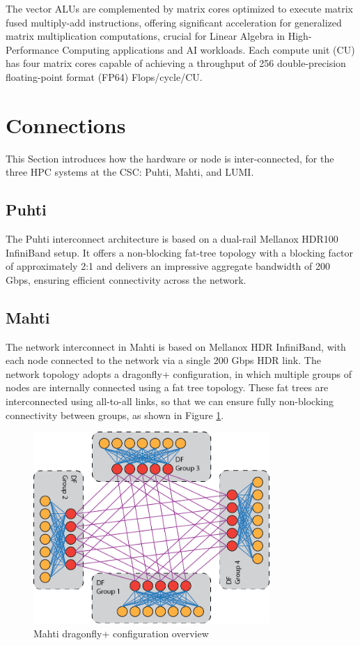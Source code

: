 The vector ALUs are complemented by matrix cores optimized to execute matrix fused multiply-add instructions, offering significant acceleration for generalized matrix multiplication computations, crucial for Linear Algebra in High-Performance Computing applications and AI workloads. Each compute unit (CU) has four matrix cores capable of achieving a throughput of 256 double-precision floating-point format (FP64) Flops/cycle/CU.

\section{Connections}
This Section introduces how the hardware or node is inter-connected, for the three HPC systems at the CSC: Puhti, Mahti, and LUMI.

\subsection{Puhti}
The Puhti\cite{puhti} interconnect architecture is based on a dual-rail Mellanox HDR100 InfiniBand setup. It offers a non-blocking fat-tree topology with a blocking factor of approximately 2:1 and delivers an impressive aggregate bandwidth of 200 Gbps, ensuring efficient connectivity across the network.

\subsection{Mahti}
The network interconnect in Mahti is based on Mellanox HDR InfiniBand, with each node connected to the network via a single 200 Gbps HDR link. The network topology adopts a dragonfly+ configuration, in which multiple groups of nodes are internally connected using a fat tree topology. These fat trees are interconnected using all-to-all links, so that we can ensure fully non-blocking connectivity between groups, as shown in Figure \ref{fig_mahti_df_ex}.

\begin{figure}[H]
    \centering
    \includegraphics[width=0.8\textwidth]{figures/mahti_df_ex.png}
    \caption{Mahti dragonfly+ configuration overview \cite{mahti}}
    \label{fig_mahti_df_ex}
\end{figure}

